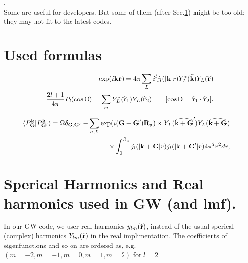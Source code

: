\documentclass[a4paper,10pt,epsf,fleqn]{article}
\newcommand{\figp}[1]{\rotatebox{-90}{\texttt{[image: \#1]}}}
\begin{document}


%





\newpage
{}.  \\Some are useful for developers. But some of them 
(after Sec.\ref{usedf}) might be too old; 
they may not fit to the latest codes.


\appendix
\section{Used formulas}
\label{usedf}
\begin{eqnarray}
&&\exp( i {\bf k} {\bf r}) = 4 \pi \sum_L i^l 
j_l(|{\bf k}|r)  Y^*_L( {\bf \widehat{ k} }) Y_L(\widehat{{\bf r}}) \\
&&\frac{2l+1}{4 \pi} P_l(\cos\Theta) = \sum_m Y^*_L( {\bf \widehat{r}}_1) 
Y_L({\bf \widehat{r}}_2) \ \ \ \ \ \ 
[\cos \Theta = {\bf \widehat{r}}_1 \cdot {\bf \widehat{r}}_2].
\end{eqnarray}

\begin{eqnarray}
\langle P^{\bf k}_{\bf G}|P^{\bf k}_{{\bf G}'} \rangle
= \Omega \delta_{{\bf G},{\bf G}'} -  
\sum_{a,L} \exp( i ({\bf G}-{\bf G}') {\bf R_a}) \times Y_L(\widehat{{\bf k+G}}') 
Y_L( {\bf \widehat{ k+G} }) \nonumber \\
\times \int_0^{R_a} j_l(|{\bf k+G}|r)j_l(|{\bf k+G}'|r) 4 \pi^2 r^2 dr,
\end{eqnarray}

\section{Sperical Harmonics and Real harmonics used in GW (and lmf).}

In our GW code, we user real harmonics $y_{lm}(\hat{\bf r})$,
instead of the usual sperical (complex) harmonics $Y_{lm}(\hat{\bf r})$
in the real implimentation.
The coefficients of eigenfunctions and so on are ordered as, e.g.
$(m=-2, m=-1, m=0, m=1,m=2)$ for $l=2$.
\end{document}
